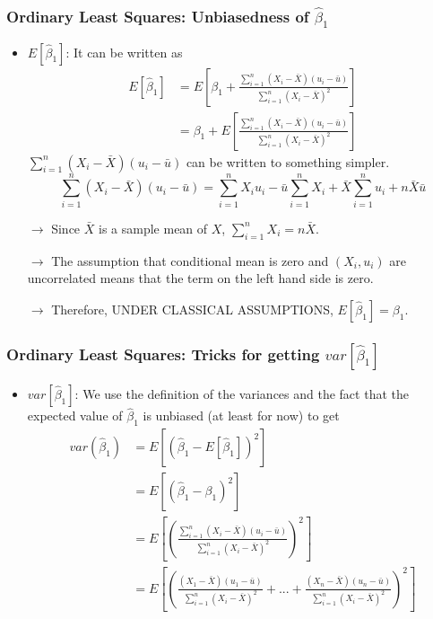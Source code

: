 \documentclass[aspectratio=169]{beamer}
\begin{document}
\begin{frame}
\frametitle{Ordinary Least Squares: Unbiasedness of $\hat{\beta}_1$}
\begin{itemize}
\item $E[\hat{\beta}_1]$: It can be written as
\small{\[
\begin{aligned}
E[\hat{\beta}_1]& = E\left[\beta_1+  \frac{\sum_{i=1}^n(X_i-\bar{X})(u_i-\bar{u})}{\sum_{i=1}^n(X_i-\bar{X})^2}\right]\\
&=\beta_1+ E\left[\frac{\sum_{i=1}^n(X_i-\bar{X})(u_i-\bar{u})}{\sum_{i=1}^n(X_i-\bar{X})^2}\right]
\end{aligned}
\]}\normalsize
$\sum_{i=1}^n(X_i-\bar{X})(u_i-\bar{u})$ can be written to something simpler.
\small{\[
\sum_{i=1}^n(X_i-\bar{X})(u_i-\bar{u})=\sum_{i=1}^nX_iu_i-\bar{u}\sum_{i=1}^n X_i+\bar{X}\sum_{i=1}^nu_i+n\bar{X}\bar{u}
\]}\normalsize
\item[$\to$] Since $\bar{X}$ is a sample mean of $X$, $\sum_{i=1}^nX_i=n\bar{X}$. \\
\item[$\to$] The assumption that conditional mean is zero and $(X_i, u_i)$ are uncorrelated means that the term on the left hand side is zero. 
\item[$\to$] Therefore, UNDER CLASSICAL ASSUMPTIONS, $E[\hat{\beta}_1]=\beta_1$.

\end{itemize}
\end{frame}

\begin{frame}
\frametitle{Ordinary Least Squares: Tricks for getting $var[\hat{\beta}_1]$}
\begin{itemize}
\item $var[\hat{\beta}_1]$: We use the definition of the variances and the fact that the expected value of $\hat{\beta}_1$ is unbiased (at least for now) to get
\[
\begin{aligned}
var(\hat{\beta}_1)&=E\left[\left(\hat{\beta}_1-E[\hat{\beta}_1]\right)^2\right] \\
&=E\left[\left(\hat{\beta}_1-{\beta}_1\right)^2\right]\\
&=E\left[\left( \frac{\sum_{i=1}^n(X_i-\bar{X})(u_i-\bar{u})}{\sum_{i=1}^n(X_i-\bar{X})^2} \right)^2\right]\\
&=E\left[\left(  \frac{(X_1-\bar{X})(u_1-\bar{u})}{\sum_{i=1}^n(X_i-\bar{X})^2}+...+\frac{(X_n-\bar{X})(u_n-\bar{u})}{\sum_{i=1}^n(X_i-\bar{X})^2} \right)^2\right]\\
\end{aligned}
\]
\end{itemize}
\end{frame}
\end{document}
